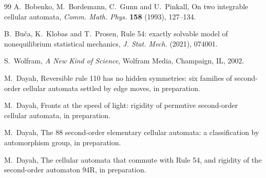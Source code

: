 \begin{thebibliography}{99}
 A.~Bobenko, M.~Bordemann, C.~Gunn and U.~Pinkall, On two integrable cellular automata, \emph{Comm. Math. Phys.} \textbf{158} (1993), 127--134.

 B.~Bu\v{c}a, K.~Klobas and T.~Prosen, Rule 54: exactly solvable model of nonequilibrium statistical mechanics, \emph{J. Stat. Mech.} (2021), 074001.

 S.~Wolfram, \emph{A New Kind of Science}, Wolfram Media, Champaign, IL, 2002.

 M.~Dayah, Reversible rule 110 has no hidden symmetries: six families of second-order cellular automata settled by edge moves, in preparation.

 M.~Dayah, Fronts at the speed of light: rigidity of permutive second-order cellular automata, in preparation.

 M.~Dayah, The 88 second-order elementary cellular automata: a classification by automorphism group, in preparation.

 M.~Dayah, The cellular automata that commute with Rule 54, and rigidity of the second-order automaton 94R, in preparation.

\end{thebibliography}
